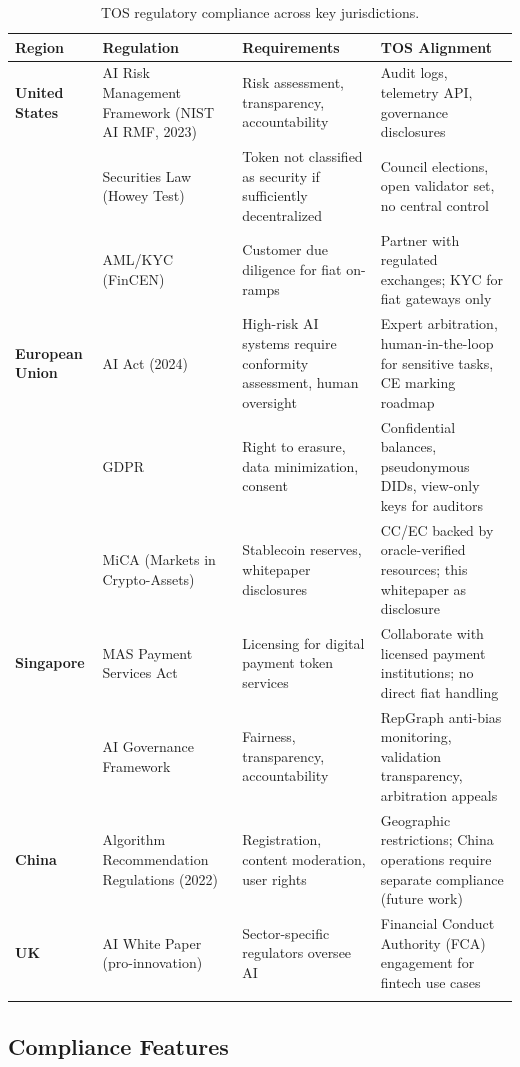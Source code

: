 \documentclass[11pt]{article}
\begin{document}
\begin{longtable}{@{}p{}p{}p{}p{}@{}}
\toprule
\textbf{Region} & \textbf{Regulation} & \textbf{Requirements} & \textbf{TOS Alignment} \\\midrule
\textbf{United States} & AI Risk Management Framework (NIST AI RMF, 2023) & Risk assessment, transparency, accountability & Audit logs, telemetry API, governance disclosures \\
 & Securities Law (Howey Test) & Token not classified as security if sufficiently decentralized & Council elections, open validator set, no central control \\
 & AML/KYC (FinCEN) & Customer due diligence for fiat on-ramps & Partner with regulated exchanges; KYC for fiat gateways only \\
\textbf{European Union} & AI Act (2024) & High-risk AI systems require conformity assessment, human oversight & Expert arbitration, human-in-the-loop for sensitive tasks, CE marking roadmap \\
 & GDPR & Right to erasure, data minimization, consent & Confidential balances, pseudonymous DIDs, view-only keys for auditors \\
 & MiCA (Markets in Crypto-Assets) & Stablecoin reserves, whitepaper disclosures & CC/EC backed by oracle-verified resources; this whitepaper as disclosure \\
\textbf{Singapore} & MAS Payment Services Act & Licensing for digital payment token services & Collaborate with licensed payment institutions; no direct fiat handling \\
 & AI Governance Framework & Fairness, transparency, accountability & RepGraph anti-bias monitoring, validation transparency, arbitration appeals \\
\textbf{China} & Algorithm Recommendation Regulations (2022) & Registration, content moderation, user rights & Geographic restrictions; China operations require separate compliance (future work) \\
\textbf{UK} & AI White Paper (pro-innovation) & Sector-specific regulators oversee AI & Financial Conduct Authority (FCA) engagement for fintech use cases \\
\bottomrule
\caption{TOS regulatory compliance across key jurisdictions.}
\end{longtable}

\subsection{Compliance Features}
\end{document}
